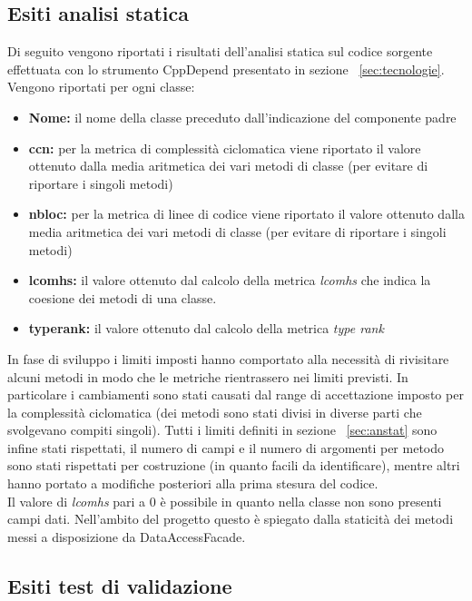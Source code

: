 \documentclass[a4paper,13pt,twoside]{article}
\begin{document}
\subsection{Esiti analisi statica} \label{sec:esiti}
Di seguito vengono riportati i risultati dell'analisi statica sul codice sorgente effettuata con lo strumento CppDepend presentato in sezione ~\ref{sec:tecnologie}. Vengono riportati per ogni classe:
\begin{itemize}
	\item \textbf{Nome: } il nome della classe preceduto dall'indicazione del componente padre
	\item \textbf{ccn: } per la metrica di complessità ciclomatica viene riportato il valore ottenuto dalla media aritmetica dei vari metodi di classe (per evitare di riportare i singoli metodi)
	\item \textbf{nbloc: } per la metrica di linee di codice viene riportato il valore ottenuto dalla media aritmetica dei vari metodi di classe (per evitare di riportare i singoli metodi)
	\item \textbf{lcomhs: } il valore ottenuto dal calcolo della metrica \textit{lcomhs} che indica la coesione dei metodi di una classe.
	\item \textbf{typerank: } il valore ottenuto dal calcolo della metrica \textit{type rank}
\end{itemize}
In fase di sviluppo i limiti imposti hanno comportato alla necessità di rivisitare alcuni metodi in modo che le metriche rientrassero nei limiti previsti. In particolare i cambiamenti sono stati causati dal range di accettazione imposto per la complessità ciclomatica (dei metodi sono stati divisi in diverse parti che svolgevano compiti singoli). Tutti i limiti definiti in sezione ~\ref{sec:anstat} sono infine stati rispettati, il numero di campi e il numero di argomenti per metodo sono stati rispettati per costruzione (in quanto facili da identificare), mentre altri hanno portato a modifiche posteriori alla prima stesura del codice.\\ Il valore di \textit{lcomhs} pari a 0 è possibile in quanto nella classe non sono presenti campi dati. Nell'ambito del progetto questo è spiegato dalla staticità dei metodi messi a disposizione da DataAccessFacade.\\ 


\subsection{Esiti test di validazione}

\end{document}
